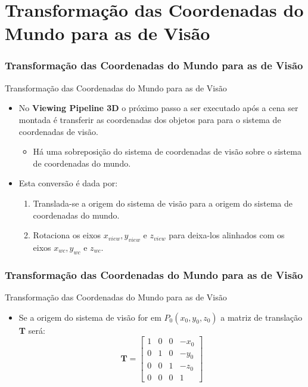 \documentclass{beamer}
\begin{document}
\section{Transformação das Coordenadas do Mundo para as de Visão}
\begin{frame}
\frametitle{Transformação das Coordenadas do Mundo para as de Visão}
	\begin{block}{Transformação das Coordenadas do Mundo para as de Visão}
		\begin{itemize}
			\item No \textbf{Viewing Pipeline 3D} o próximo passo a ser executado após a cena ser montada é transferir as coordenadas dos objetos para para o sistema de coordenadas de visão.
			\begin{itemize}
				\item Há uma sobreposição do sistema de coordenadas de visão sobre o sistema de coordenadas do mundo.
			\end{itemize}
			\item Esta conversão é dada por:
				\begin{enumerate}
					\item Translada-se a origem do sistema de visão para a origem do sistema de coordenadas do mundo.
					\item Rotaciona os eixos $x_{view},y_{view}$ e $z_{view}$ para deixa-los alinhados com os eixos $x_{wc},y_{wc}$ e $z_{wc}$.
				\end{enumerate}
		\end{itemize}
	\end{block}
\end{frame}



\begin{frame}
\frametitle{Transformação das Coordenadas do Mundo para as de Visão}
	\begin{block}{Transformação das Coordenadas do Mundo para as de Visão}
		\begin{itemize}
			\item Se a origem do sistema de visão for em $P_0(x_0,y_0,z_0)$ a matriz de translação \textbf{T} será:
			\begin{equation*}
				\textbf{T} = \begin{bmatrix}
					1	&	0	&	0	&	-x_0	\\
					0	&	1	&	0	&	-y_0\\
					0	&	0	&	1	&	-z_0\\
					0	&	0	&	0	&	1
				\end{bmatrix}
			\end{equation*}
		\end{itemize}
	\end{block}
\end{frame}
\end{document}
